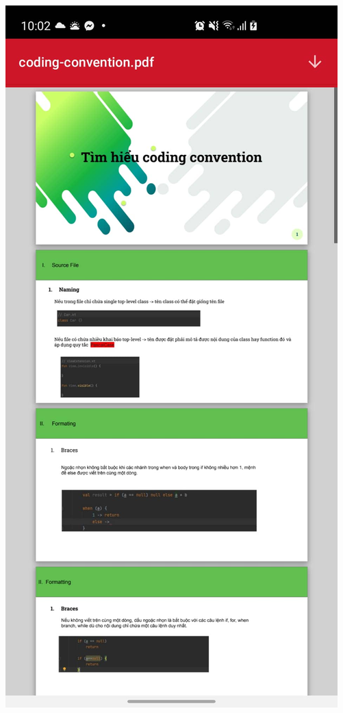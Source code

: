 \documentclass[../Main.tex]{subfiles}
\begin{document}
\begin{minipage}{0.5\textwidth}
\includegraphics[width=0.7\linewidth]{Figure/screen/show_file_att.jpg}
 \label{fig:star2}
\end{minipage}
\end{document}
